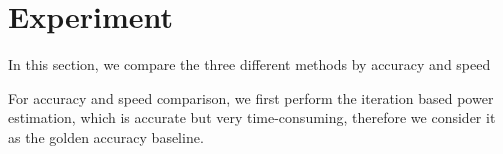 \section{Experiment}
In this section, we compare the three different methods by accuracy and speed


For accuracy and speed comparison, we first perform the iteration based power estimation, which is accurate but very time-consuming, therefore we consider it as the golden accuracy baseline. 